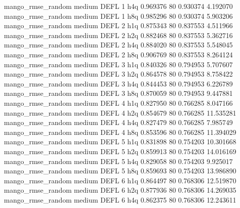 mango_rmse_random     medium     DEFL                 1                  h4q  0.969376 80       0.930374           4.192070
mango_rmse_random     medium     DEFL                 1                  h8q  0.985296 80       0.930374           5.903206
mango_rmse_random     medium     DEFL                 2                  h1q  0.875343 80       0.837553           4.511966
mango_rmse_random     medium     DEFL                 2                  h2q  0.882468 80       0.837553           5.362716
mango_rmse_random     medium     DEFL                 2                  h4q  0.884020 80       0.837553           5.548045
mango_rmse_random     medium     DEFL                 2                  h8q  0.906769 80       0.837553           8.264124
mango_rmse_random     medium     DEFL                 3                  h1q  0.840326 80       0.794953           5.707607
mango_rmse_random     medium     DEFL                 3                  h2q  0.864578 80       0.794953           8.758422
mango_rmse_random     medium     DEFL                 3                  h4q  0.844453 80       0.794953           6.226789
mango_rmse_random     medium     DEFL                 3                  h8q  0.870059 80       0.794953           9.447881
mango_rmse_random     medium     DEFL                 4                  h1q  0.827950 80       0.766285           8.047166
mango_rmse_random     medium     DEFL                 4                  h2q  0.854679 80       0.766285          11.535281
mango_rmse_random     medium     DEFL                 4                  h4q  0.827479 80       0.766285           7.985749
mango_rmse_random     medium     DEFL                 4                  h8q  0.853596 80       0.766285          11.394029
mango_rmse_random     medium     DEFL                 5                  h1q  0.831898 80       0.754203          10.301668
mango_rmse_random     medium     DEFL                 5                  h2q  0.859913 80       0.754203          14.016169
mango_rmse_random     medium     DEFL                 5                  h4q  0.829058 80       0.754203           9.925017
mango_rmse_random     medium     DEFL                 5                  h8q  0.859693 80       0.754203          13.986890
mango_rmse_random     medium     DEFL                 6                  h1q  0.864497 80       0.768306          12.519870
mango_rmse_random     medium     DEFL                 6                  h2q  0.877936 80       0.768306          14.269035
mango_rmse_random     medium     DEFL                 6                  h4q  0.862375 80       0.768306          12.243611
